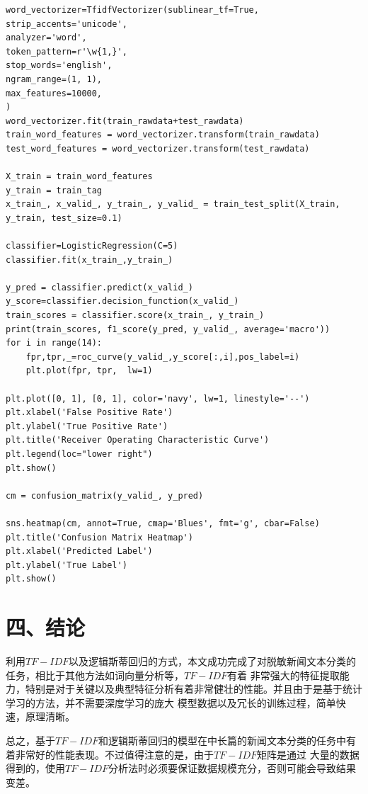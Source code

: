 \documentclass{article}
\begin{document}
\begin{verbatim}
word_vectorizer=TfidfVectorizer(sublinear_tf=True,
strip_accents='unicode',
analyzer='word',
token_pattern=r'\w{1,}',
stop_words='english',
ngram_range=(1, 1),
max_features=10000,
)
word_vectorizer.fit(train_rawdata+test_rawdata)
train_word_features = word_vectorizer.transform(train_rawdata)
test_word_features = word_vectorizer.transform(test_rawdata)

X_train = train_word_features
y_train = train_tag
x_train_, x_valid_, y_train_, y_valid_ = train_test_split(X_train, y_train, test_size=0.1)

classifier=LogisticRegression(C=5)
classifier.fit(x_train_,y_train_)

y_pred = classifier.predict(x_valid_)
y_score=classifier.decision_function(x_valid_)
train_scores = classifier.score(x_train_, y_train_)
print(train_scores, f1_score(y_pred, y_valid_, average='macro'))
for i in range(14):
    fpr,tpr,_=roc_curve(y_valid_,y_score[:,i],pos_label=i)
    plt.plot(fpr, tpr,  lw=1)

plt.plot([0, 1], [0, 1], color='navy', lw=1, linestyle='--')
plt.xlabel('False Positive Rate')
plt.ylabel('True Positive Rate')
plt.title('Receiver Operating Characteristic Curve')
plt.legend(loc="lower right")
plt.show()

cm = confusion_matrix(y_valid_, y_pred)

sns.heatmap(cm, annot=True, cmap='Blues', fmt='g', cbar=False)
plt.title('Confusion Matrix Heatmap')
plt.xlabel('Predicted Label')
plt.ylabel('True Label')
plt.show()
\end{verbatim}
\section*{\LARGE 四、结论}
利用$TF-IDF$以及逻辑斯蒂回归的方式，本文成功完成了对脱敏新闻文本分类的任务，相比于其他方法如词向量分析等，$TF-IDF$有着
非常强大的特征提取能力，特别是对于关键以及典型特征分析有着非常健壮的性能。并且由于是基于统计学习的方法，并不需要深度学习的庞大
模型数据以及冗长的训练过程，简单快速，原理清晰。

总之，基于$TF-IDF$和逻辑斯蒂回归的模型在中长篇的新闻文本分类的任务中有着非常好的性能表现。不过值得注意的是，由于$TF-IDF$矩阵是通过
大量的数据得到的，使用$TF-IDF$分析法时必须要保证数据规模充分，否则可能会导致结果变差。
\end{document}
